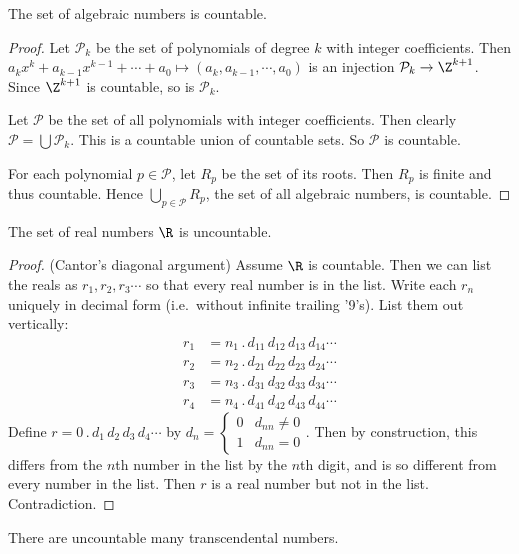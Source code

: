 \documentclass[a4paper]{article}
\begin{document}
\begin{thm}
  The set of algebraic numbers is countable.
\end{thm}
\begin{proof}
  Let $\mathcal{P}_k$ be the set of polynomials of degree $k$ with integer coefficients. Then $a_kx^k + a_{k - 1}x^{k - 1} + \cdots + a_0 \mapsto (a_k, a_{k - 1}, \cdots, a_0)$ is an injection $\mathcal{P}_k \to \Z^{k + 1}$. Since $\Z^{k + 1}$ is countable, so is $\mathcal{P}_k$.

  Let $\mathcal{P}$ be the set of all polynomials with integer coefficients. Then clearly $\mathcal{P} = \bigcup \mathcal{P}_k$. This is a countable union of countable sets. So $\mathcal{P}$ is countable.

  For each polynomial $p \in \mathcal{P}$, let $R_p$ be the set of its roots. Then $R_p$ is finite and thus countable. Hence $\bigcup_{p\in \mathcal{P}} R_p$, the set of all algebraic numbers, is countable.
\end{proof}

\begin{thm}
  The set of real numbers $\R$ is uncountable.
\end{thm}

\begin{proof}
  (Cantor's diagonal argument) Assume $\R$ is countable. Then we can list the reals as $r_1,r_2,r_3\cdots$ so that every real number is in the list. Write each $r_n$ uniquely in decimal form (i.e.\ without infinite trailing '9's). List them out vertically:
  \begin{align*}
    r_1 &= n_1\,.\,d_{11}\,d_{12}\,d_{13}\,d_{14}\cdots\\
    r_2 &= n_2\,.\,d_{21}\,d_{22}\,d_{23}\,d_{24}\cdots\\
    r_3 &= n_3\,.\,d_{31}\,d_{32}\,d_{33}\,d_{34}\cdots\\
    r_4 &= n_4\,.\,d_{41}\,d_{42}\,d_{43}\,d_{44}\cdots
  \end{align*}
  Define $r = 0\,.\,d_1\,d_2\,d_3\,d_4\cdots$ by $d_n =
  \begin{cases}
    0 & d_{nn}\not= 0\\
    1 & d_{nn}=0
  \end{cases}$. Then by construction, this differs from the $n$th number in the list by the $n$th digit, and is so different from every number in the list. Then $r$ is a real number but not in the list. Contradiction.
\end{proof}

\begin{cor}
  There are uncountable many transcendental numbers.
\end{cor}
\end{document}
